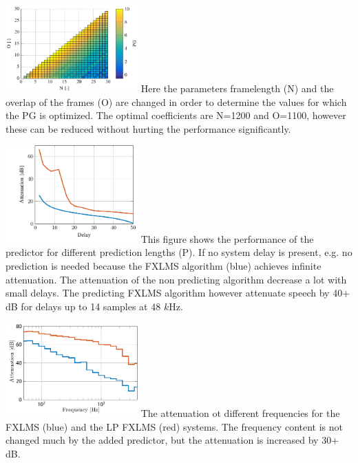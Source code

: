 

\begin{centering}
	\begin{raggedright}
		\includegraphics[width=2in]{figures/HammingNOP10.pdf}
		Here the parameters framelength (N) and the overlap of the frames (O) are changed in order to determine the values for which the PG is optimized. The optimal coefficients are N=1200 and O=1100, however these can be reduced without hurting the performance significantly.
		\label{fig:HammingNOP10}
	\end{raggedright}


	\begin{raggedleft}
	\includegraphics[width=2in]{figures/DelayRatio.pdf}
	This figure shows the performance of the predictor for different prediction lengths (P). If no system delay is present, e.g. no prediction is needed because the FXLMS algorithm (blue) achieves infinite attenuation. The attenuation of the non predicting algorithm decrease a lot with small delays. The predicting FXLMS algorithm however attenuate speech by 40+ dB for delays up to 14 samples at 48 $k$Hz.
	\label{fig:DelayRatio}
	\end{raggedleft}

	\begin{raggedleft}
	\includegraphics[width=2in]{figures/ComparedConusmerHPOur.pdf}
	The attenuation ot different frequencies for the FXLMS (blue) and the LP FXLMS (red) systems. The frequency content is not changed much by the added predictor, but the attenuation is increased by 30+ dB. 
	\label{fig:OurFreqResp}
	\end{raggedleft}
\end{centering}

